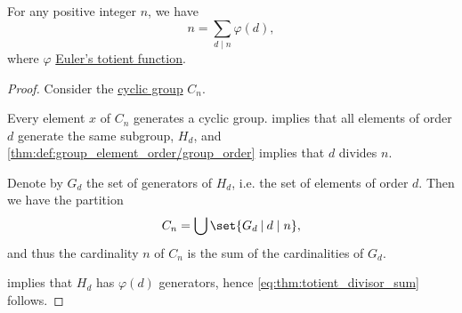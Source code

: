 \begin{theorem}\label{thm:totient_divisor_sum}
  For any positive integer \( n \), we have
  \begin{equation}\label{eq:thm:totient_divisor_sum}
    n = \sum_{d \mid n} \varphi(d),
  \end{equation}
  where \( \varphi \) \hyperref[def:eulers_totient_function]{Euler's totient function}.
\end{theorem}
\begin{proof}
  Consider the \hyperref[def:cyclic_group]{cyclic group} \( C_n \).

  Every element \( x \) of \( C_n \) generates a cyclic group.  implies that all elements of order \( d \) generate the same subgroup, \( H_d \), and \cref{thm:def:group_element_order/group_order} implies that \( d \) divides \( n \).

  Denote by \( G_d \) the set of generators of \( H_d \), i.e. the set of elements of order \( d \). Then we have the partition
  \begin{equation*}
    C_n = \bigcup \set{ G_d \given d \mid n },
  \end{equation*}
  and thus the cardinality \( n \) of \( C_n \) is the sum of the cardinalities of \( G_d \).

   implies that \( H_d \) has \( \varphi(d) \) generators, hence \eqref{eq:thm:totient_divisor_sum} follows.
\end{proof}

